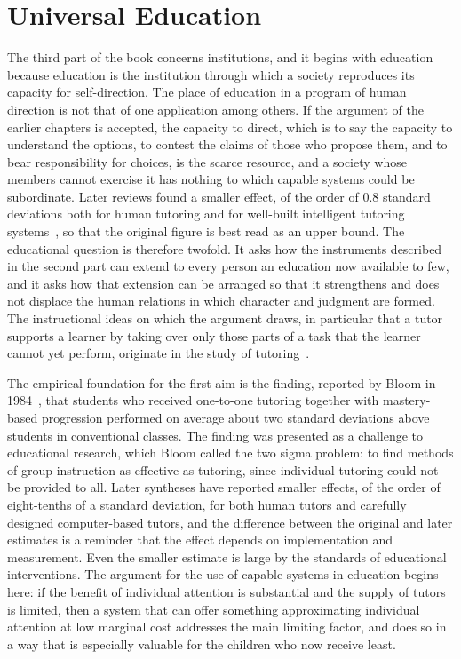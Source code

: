 \chapter{Universal Education}
\label{ch:11}

The third part of the book concerns institutions, and it begins with education because education is the institution through which a society reproduces its capacity for self-direction. The place of education in a program of human direction is not that of one application among others. If the argument of the earlier chapters is accepted, the capacity to direct, which is to say the capacity to understand the options, to contest the claims of those who propose them, and to bear responsibility for choices, is the scarce resource, and a society whose members cannot exercise it has nothing to which capable systems could be subordinate. Later reviews found a smaller effect, of the order of $0.8$ standard deviations both for human tutoring and for well-built intelligent tutoring systems~\cite{vanlehn2011}, so that the original figure is best read as an upper bound. The educational question is therefore twofold. It asks how the instruments described in the second part can extend to every person an education now available to few, and it asks how that extension can be arranged so that it strengthens and does not displace the human relations in which character and judgment are formed. The instructional ideas on which the argument draws, in particular that a tutor supports a learner by taking over only those parts of a task that the learner cannot yet perform, originate in the study of tutoring~\cite{wood1976}.

The empirical foundation for the first aim is the finding, reported by Bloom in 1984~\cite{bloom1984}, that students who received one-to-one tutoring together with mastery-based progression performed on average about two standard deviations above students in conventional classes. The finding was presented as a challenge to educational research, which Bloom called the two sigma problem: to find methods of group instruction as effective as tutoring, since individual tutoring could not be provided to all. Later syntheses have reported smaller effects, of the order of eight-tenths of a standard deviation, for both human tutors and carefully designed computer-based tutors, and the difference between the original and later estimates is a reminder that the effect depends on implementation and measurement. Even the smaller estimate is large by the standards of educational interventions. The argument for the use of capable systems in education begins here: if the benefit of individual attention is substantial and the supply of tutors is limited, then a system that can offer something approximating individual attention at low marginal cost addresses the main limiting factor, and does so in a way that is especially valuable for the children who now receive least.

